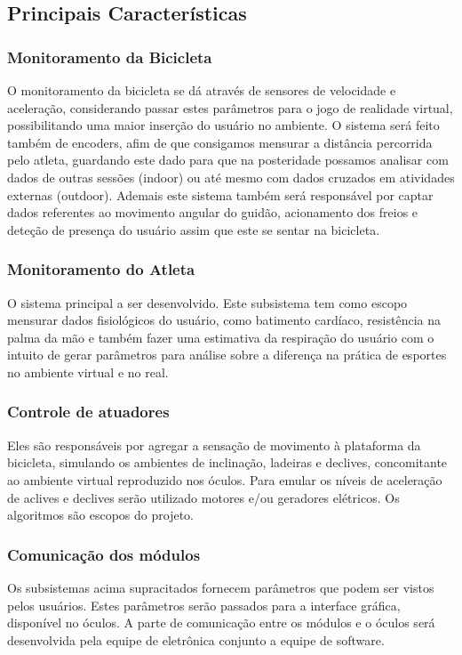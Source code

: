 \subsection{Principais Características}

\subsubsection{Monitoramento da Bicicleta}
O monitoramento da bicicleta se dá através de sensores de velocidade e aceleração, considerando passar estes parâmetros para o jogo de realidade virtual, possibilitando uma maior inserção do usuário no ambiente. O  sistema será feito também de encoders, afim de que consigamos mensurar a distância percorrida pelo atleta, guardando este dado para que na posteridade possamos analisar com dados de outras sessões (indoor) ou até mesmo com dados cruzados em atividades externas (outdoor). Ademais este sistema também será responsável por captar dados referentes ao movimento angular do guidão, acionamento dos freios e deteção de presença do usuário assim que este se sentar na bicicleta. 

\subsubsection{Monitoramento do Atleta}

O sistema principal a ser desenvolvido. Este subsistema tem como escopo mensurar dados fisiológicos do usuário, como batimento cardíaco, resistência na palma da mão e também fazer uma estimativa da respiração do usuário com o intuito de gerar parâmetros para análise sobre a diferença na prática de esportes no ambiente virtual e no real. 

\subsubsection{Controle de atuadores}
Eles são responsáveis por agregar a sensação de movimento à plataforma da bicicleta, simulando os ambientes de inclinação, ladeiras e declives, concomitante ao ambiente virtual reproduzido nos óculos. Para emular os níveis de aceleração de aclives e declives serão utilizado motores e/ou geradores elétricos. Os algoritmos são escopos do projeto.

\subsubsection{Comunicação dos módulos}
Os subsistemas acima supracitados fornecem parâmetros que podem ser vistos pelos usuários. Estes parâmetros serão passados para a interface gráfica, disponível no óculos. A parte de comunicação entre os módulos e o óculos será desenvolvida pela equipe de eletrônica conjunto a equipe de software.

